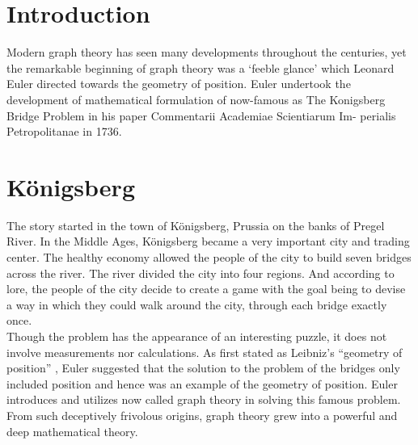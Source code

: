\documentclass[acmsmall]{acmart}
\begin{document}
%

%
%
\maketitle

\section{Introduction}
Modern graph theory has seen many developments throughout the centuries, yet the remarkable beginning of graph theory was a ‘feeble glance’ which Leonard Euler directed towards the geometry of position. Euler undertook the development of mathematical formulation of now-famous as The Konigsberg Bridge Problem in his paper Commentarii Academiae Scientiarum Im- perialis Petropolitanae in 1736.

\section{Königsberg}
The story started in the town of Königsberg, Prussia on the banks of Pregel River. In the Middle Ages, Königsberg became a very important city and trading center. The healthy economy allowed the people of the city to build seven bridges across the river. The river divided the city into four regions. And according to lore, the people of the city decide to create a game with the goal being to devise a way in which they could walk around the city, through each bridge exactly once.\\

Though the problem has the appearance of an interesting puzzle, it does not involve measurements nor calculations. As first stated as Leibniz’s “geometry of position” , Euler suggested that the solution to the problem of the bridges only included position and hence was an example of the geometry of position. Euler introduces and utilizes now called
graph theory in solving this famous problem. From such deceptively frivolous origins, graph theory grew into a powerful and deep mathematical theory.
\end{document}
